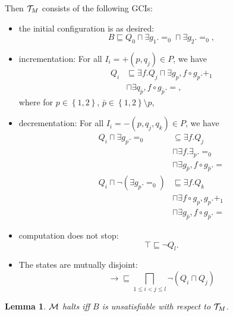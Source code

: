 \documentclass[openany]{scrbook}
\theoremstyle{break}
\newtheorem{Lemma}[Theorem]{Lemma}
\theoremstyle{nonumberbreak}
\theoremstyle{nonumberplain}
\theoremstyle{nonumberbreak}
\newcommand{\set}[1]{\left\{#1\right\}}
\begin{document}
Then ${\cal T}_M$ consists of the following GCIs:
\begin{itemize}
\item the initial configuration is as desired:
  \begin{equation*}
    B \sqsubseteq Q_0 \sqcap \exists g_1. =_0 \sqcap \exists g_2. =_0,
  \end{equation*}
\item incrementation: For all $I_i = +(p, q_j) \in P$, we have
  \begin{align*}
    Q_i & \sqsubseteq \exists f. Q_j \sqcap \exists g_p, f \circ
    g_p. +_1 \\
    & \sqcap \exists q_{\bar{p}}, f \circ g_{\bar{p}}. =,
  \end{align*}
  where for $p \in \set{1, 2}$, $\bar{p} \in \set{1, 2} \setminus p$,
\item decrementation: For all $I_i = -(p, q_j, q_k) \in P$, we have
  \begin{align*}
    Q_i \sqcap \exists g_p. =_0 & \subseteq \exists f. Q_j \\
    & \sqcap \exists f. \exists _p. =_0 \\
    & \sqcap \exists g_{\bar{p}}, f \circ g_{\bar{p}}. = \\
    Q_i \sqcap \neg(\exists g_p. =_0) & \sqsubseteq \exists f. Q_k \\
    & \sqcap \exists f \circ g_p, g_p. +_1 \\
    & \sqcap \exists g_{\bar{p}}, f \circ g_{\bar{p}}. =
  \end{align*}
\item computation does not stop:
  \begin{equation*}
    \top \sqsubseteq \neg Q_l.
  \end{equation*}
\item The states are mutually disjoint:
  \begin{equation*}
    \to \sqsubseteq \bigsqcap_{1 \leq i < j \leq l}{\neg(Q_i \sqcap Q_j)}
  \end{equation*}
\end{itemize}

\begin{Lemma}
  \label{7.12}
  ${\cal M}$ halts iff $B$ is unsatisfiable with respect to ${\cal
    T}_M$.
\end{Lemma}
\end{document}
